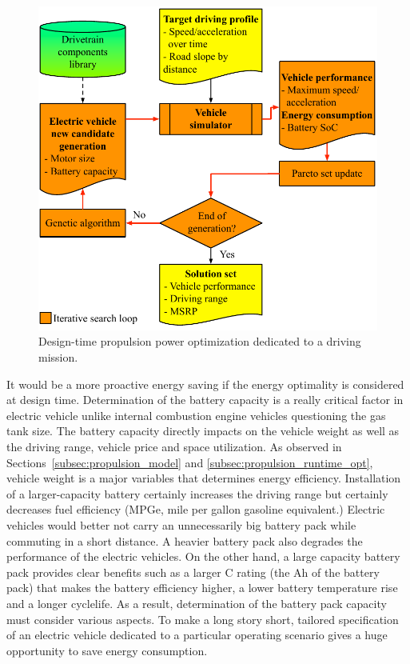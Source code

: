 \begin{figure}
\centering
\includegraphics[width=1.0\hsize]{Figures/Naehyuck_Chang/design_optimization.pdf}
\caption{Design-time propulsion power optimization dedicated to a driving mission.}
\label{fig:design_opt}
\end{figure} 


It would be a more proactive energy saving if the energy optimality is considered at design time. Determination of the battery capacity is a really critical factor in electric vehicle unlike internal combustion engine vehicles questioning the gas tank size. The battery capacity directly impacts on the vehicle weight as well as the driving range, vehicle price and space utilization. As observed in Sections~\ref{subsec:propulsion_model} and \ref{subsec:propulsion_runtime_opt}, vehicle weight is a major variables that determines energy efficiency. Installation of a larger-capacity battery certainly increases the driving range but certainly decreases fuel efficiency (MPGe, mile per gallon gasoline equivalent.) Electric vehicles would better not carry an unnecessarily big battery pack while commuting in a short distance. A heavier battery pack also degrades the performance of the electric vehicles. On the other hand, a large capacity battery pack provides clear benefits such as a larger C rating (the Ah of the battery pack) that makes the battery efficiency higher, a lower battery temperature rise and a longer cyclelife. As a result, determination of the battery pack capacity must consider various aspects. To make a long story short, tailored specification of an electric vehicle dedicated to a particular operating scenario gives a huge opportunity to save energy consumption.

